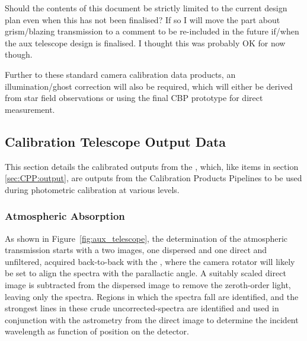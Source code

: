 \begin{itemize}

\end{itemize}

\begin{note}
	Should the contents of this document be strictly limited to the current design plan even when this has not been finalised? If so I will move the part about grism/blazing transmission to a comment to be re-included in the future if/when the aux telescope design is finalised. I thought this was probably OK for now though.
\end{note}

Further to these standard camera calibration data products, an illumination/ghost correction will also be required, which will either be derived from star field observations or using the final CBP prototype for direct measurement.







\subsection{Calibration Telescope Output Data}
\label{sec:CPP:auxTelescope:outputs}
This section details the calibrated outputs from the \auxtelescope, which, like items in section \secsymbol\ref{sec:CPP:output}, are outputs from the Calibration Products Pipelines to be used during photometric calibration at various levels.


\subsubsection{Atmospheric Absorption}\label{sec:CPP:aux:atmosphericAbsorption}
As shown in Figure~\ref{fig:aux_telescope}, the determination of the atmospheric transmission starts with a two images, one dispersed and one direct and unfiltered, acquired back-to-back with the \auxtelescope, where the camera rotator will likely be set to align the spectra with the parallactic angle. A suitably scaled direct image is subtracted from the dispersed image to remove the zeroth-order light, leaving only the spectra. Regions in which the spectra fall are identified, and the strongest lines in these crude uncorrected-spectra are identified and used in conjunction with the astrometry from the direct image to determine the incident wavelength as function of position on the detector. 

